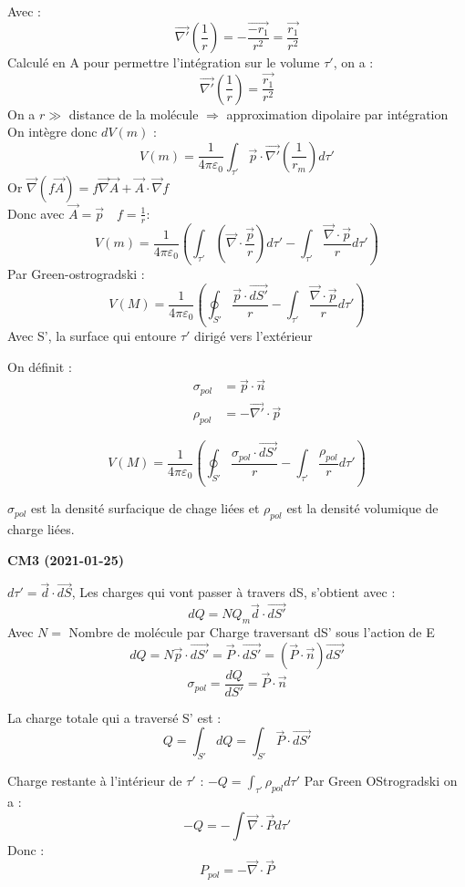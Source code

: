 \documentclass[12pt,a4paper]{report}
\begin{document}
Avec :
\[
	\vec{\nabla'} (\frac{1}{r}) = -\frac{\vec{-r_1}}{r^2} = \frac{\vec{r_1}}{r^2}
\]
Calculé en A pour permettre l'intégration sur le volume \(\tau'\), on a :
\[
	\vec{\nabla'} (\frac{1}{r}) = \frac{\vec{r_1}}{r^2}
\]
On a \(r \gg \) distance de la molécule \( \Rightarrow \) approximation dipolaire par intégration
On intègre donc \(dV(m)\) :
\[
	V(m) = \dfrac{1}{4\pi \varepsilon_0} \int_{\tau'} \vec{p} \cdot \vec{\nabla'} (\frac{1}{r_m}) d\tau'
\]
Or \(\vec{\nabla} (f \vec{A}) = f \vec{\nabla} \vec{A} + \vec{A} \cdot \vec{\nabla} f \)\\
Donc avec \(\vec{A} = \vec{p} \quad f = \frac{1}{r}\):
\[
	V(m) = \dfrac{1}{4\pi \varepsilon_0} \left( \int_{\tau'} \left( \vec{\nabla} \cdot \dfrac{\vec{p}}{r} \right) d\tau' - \int_{\tau'} \dfrac{\vec{\nabla} \cdot \vec{p}}{r} d\tau'\right)
\]
Par Green-ostrogradski :
\[
	V(M) = \dfrac{1}{4\pi \varepsilon_0} \left( \oint_{S'} \dfrac{\vec{p} \cdot \vec{dS'}}{r} - \int_{\tau'} \dfrac{\vec{\nabla} \cdot \vec{p}}{r} d\tau' \right)
\]
Avec S', la surface qui entoure \(\tau'\) dirigé vers l'extérieur

On définit :
\begin{align*}
	\sigma_{pol} &= \vec{p} \cdot \vec{n}\\ 
	\rho_{pol} &= - \vec{\nabla'} \cdot \vec{p}
\end{align*}

\[
	V(M) = \dfrac{1}{4\pi \varepsilon_0} \left( \oint_{S'} \dfrac{\sigma_{pol} \cdot \vec{dS'}}{r} - \int_{\tau'} \dfrac{\rho_{pol}}{r} d\tau' \right)
\]

\(\sigma_{pol}\) est la densité surfacique de chage liées et \(\rho_{pol}\) est la densité volumique de charge liées.

\begin{center}
\textbf{CM3 (2021-01-25)}
\end{center}

\(d\tau' = \vec{d} \cdot \vec{dS}\), Les charges qui vont passer à travers dS, s'obtient avec :\[
	dQ = N Q_m \vec{d} \cdot \vec{dS'}
\]
Avec \(N = \) Nombre de molécule par 
Charge traversant dS' sous l'action de E
\[
	dQ = N \vec{p} \cdot \vec{dS'} = \vec{P} \cdot \vec{dS'} = (\vec{P} \cdot \vec{n}) \vec{dS'}
\]
\[
	\sigma_{pol} = \dfrac{dQ}{dS'} = \vec{P} \cdot \vec{n}
\]

La charge totale qui a traversé S' est :
\[
	Q = \int_{S'} dQ = \int_{S'} \vec{P} \cdot \vec{dS'}
\]

Charge restante à l'intérieur de \(\tau'\) : \(-Q = \int_{\tau'} \rho_{pol} d\tau'\)
Par Green OStrogradski on a :
\[
	-Q = - \int \vec{\nabla} \cdot \vec{P} d\tau'
\]
Donc :
\[
	P_{pol} = - \vec{\nabla} \cdot \vec{P}
\]
\end{document}
